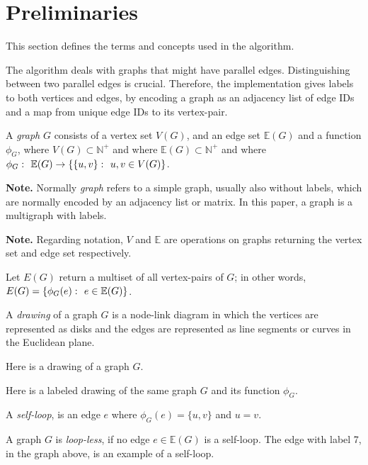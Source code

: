 \documentclass{article}
\begin{document}

\section{Preliminaries}

	This section defines the terms and concepts used in the algorithm.

	The algorithm deals with graphs that might have parallel edges. Distinguishing between two parallel edges is crucial. Therefore, the implementation gives labels to both vertices and edges, by encoding a graph as an adjacency list of edge IDs and a map from unique edge IDs to its vertex-pair.

	A \textit{graph} $G$ consists of a vertex set $V(G)$, and an edge set $\mathbb{E}(G)$ and a function $\phi_G$, where $V(G) \subset \mathbb{N}^+$ and where $\mathbb{E}(G) \subset \mathbb{N}^+$ and where $\phi_G \,\colon\  \mathbb{E}(G) \to \{\{u,v\} \,\colon\  u,v \in V(G)\}$.

	\textbf{Note.} Normally \textit{graph} refers to a simple graph, usually also without labels, which are normally encoded by an adjacency list or matrix. In this paper, a graph is a multigraph with labels.

	\textbf{Note.} Regarding notation, $V$ and $\mathbb{E}$ are operations on graphs returning the vertex set and edge set respectively.

	Let $E(G)$ return a multiset of all vertex-pairs of $G$; in other words, $E(G) = \{\phi_G(e) \,\colon\  e \in \mathbb{E}(G)\}$.

	A \textit{drawing} of a graph $G$ is a node-link diagram in which the vertices are represented as disks and the edges are represented as line segments or curves in the Euclidean plane.

	Here is a drawing of a graph $G$.

	\begin{center}
		
	\end{center}

	Here is a labeled drawing of the same graph $G$ and its function $\phi_G$.

	\begin{center}
		
	\end{center}

	A \textit{self-loop}, is an edge $e$ where $\phi_G(e) = \{u,v\}$ and $u = v$.

	A graph $G$ is \textit{loop-less}, if no edge $e \in \mathbb{E}(G)$ is a self-loop. The edge with label 7, in the graph above, is an example of a self-loop.
\end{document}
